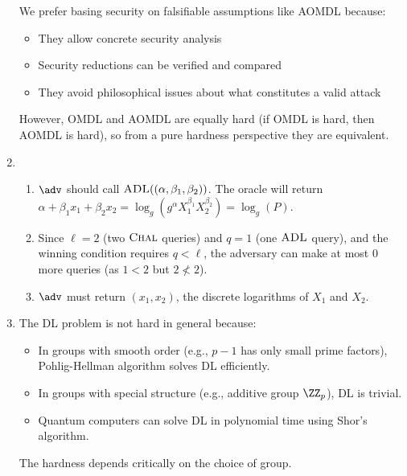 \begin{enumerate}
        We prefer basing security on falsifiable assumptions like AOMDL because:
        \begin{itemize}
          \item They allow concrete security analysis
          \item Security reductions can be verified and compared
          \item They avoid philosophical issues about what constitutes a valid attack
        \end{itemize}
        However, OMDL and AOMDL are equally hard (if OMDL is hard, then AOMDL is hard), so from a pure hardness perspective they are equivalent.
        
  \item \begin{enumerate}
          \item $\adv$ should call ${\normalfont\textsc{ADL}}((\alpha, \beta_1, \beta_2))$. The oracle will return $\alpha + \beta_1 x_1 + \beta_2 x_2 = \log_g(g^\alpha X_1^{\beta_1} X_2^{\beta_2}) = \log_g(P)$.
          \item Since $\ell = 2$ (two ${\normalfont\textsc{Chal}}$ queries) and $q = 1$ (one ${\normalfont\textsc{ADL}}$ query), and the winning condition requires $q < \ell$, the adversary can make at most 0 more queries (as $1 < 2$ but $2 \not< 2$).
          \item $\adv$ must return $(x_1, x_2)$, the discrete logarithms of $X_1$ and $X_2$.
        \end{enumerate}
        
  \item The DL problem is not hard in general because:
        \begin{itemize}
          \item In groups with smooth order (e.g., $p-1$ has only small prime factors), Pohlig-Hellman algorithm solves DL efficiently.
          \item In groups with special structure (e.g., additive group $\ZZ_p$), DL is trivial.
          \item Quantum computers can solve DL in polynomial time using Shor's algorithm.
        \end{itemize}
        The hardness depends critically on the choice of group.
\end{enumerate}
